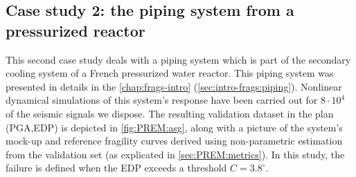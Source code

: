 \subsection{Case study 2: the piping system from a pressurized reactor}


This second case study deals with a piping system which is part of the secondary cooling system of a French pressurized water reactor. This piping system was presented in details in the \cref{chap:frags-intro} (\cref{sec:intro-frags:piping}).
Nonlinear dynamical simulations of this system's response have been carried out for $8\cdot10^4$ of the seismic signals we dispose.
The resulting validation dataset in the plan (PGA,EDP) is depicted in \cref{fig:PREM:asg}, along with a picture of the system's mock-up and reference fragility curves derived using non-parametric estimation from the validation set (as explicated in \cref{sec:PREM:metrics}).
In this study, the failure is defined when the EDP exceeds a threshold $C=3.8^\circ$.





